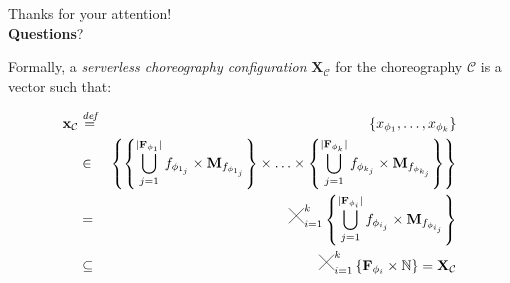 \documentclass[13.5pt]{beamer}
\newcommand{\B}[1]{\textcolor{TorVergataColor}{\textbf{#1}}}
\newcommand{\Cross}{\mathbin{\tikz [x=2.5ex,y=2.5ex,line width=.10ex] \draw (0,0) -- (1,1) (0,1) -- (1,0);}}
\newcommand{\mathDef}{\overset{\textit{def}}{=}}
\begin{document}


\begin{frame}{{}}
	\begin{block}{}
		\centering
		Thanks for your attention!\\\B{Questions}?
	\end{block}
\end{frame} 



\begin{frame}
	Formally, a \textit{serverless choreography configuration} $\textbf{X}_{\mathcal{C}}$ for the choreography $\mathcal{C}$ is a vector such that:
	
	\begin{eqnarray}
		\textbf{x}_{\mathcal{C}} & \mathDef & \left\lbrace x_{\phi_{1}}, \ldots, x_{\phi_{k}} \right\rbrace \nonumber \\ 
		& \in & \left\{  \left\{ \bigcup_{j=1}^{|\textbf{F}_{\phi_{1}}|} f_{\phi_{1_j}} \times \textbf{M}_{f_{\phi_{1_j}}} \right\} \times \ldots \times \left\{ \bigcup_{j=1}^{|\textbf{F}_{\phi_{k}}|} f_{\phi_{k_j}} \times \textbf{M}_{f_{\phi_{k_j}}} \right\} \right\}  \nonumber \\
		& = & \Cross_{i = 1}^k \left\{ \bigcup_{j=1}^{|\textbf{F}_{\phi_{i}}|} f_{\phi_{i_j}} \times \textbf{M}_{f_{\phi_{i_j}}} \right\} \nonumber \\
		& \subseteq & \Cross_{i = 1}^k \left\{ \textbf{F}_{\phi_{i}} \times \mathbb{N} \right\} = \textbf{X}_{\mathcal{C}}
	\end{eqnarray}
\end{frame}
\end{document}
